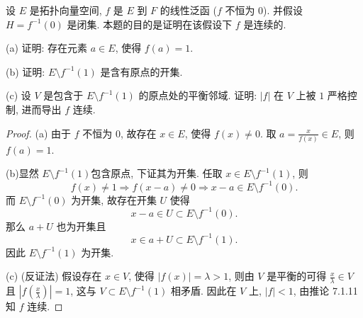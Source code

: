 \begin{exercise}
    设 $E$ 是拓扑向量空间, $f$ 是 $E$ 到 $F$ 的线性泛函 ($f$ 不恒为 $0$). 
    并假设 $H=f^{-1}(0)$ 是闭集. 本题的目的是证明在该假设下 $f$ 是连续的.

    (a) 证明: 存在元素 $a\in E$, 使得 $f(a)=1$.

    (b) 证明: $E\setminus f^{-1}(1)$ 是含有原点的开集.

    (c) 设 $V$ 是包含于 $E\setminus f^{-1}(1)$ 的原点处的平衡邻域. 证明: $|f|$ 在 $V$ 上被 $1$ 严格控制, 进而导出 $f$ 连续.
\end{exercise}

\begin{proof}
    (a) 由于 $f$ 不恒为 $0$, 故存在 $x\in E$, 使得 $f(x)\neq 0$.
    取 $a=\frac{x}{f(x)}\in E$, 则 $f(a)=1$.

    (b)显然 $E\setminus f^{-1}(1)$包含原点,
    下证其为开集. 任取 $x\in E\setminus f^{-1}(1)$, 则 
    \[f(x)\neq 1\Rightarrow f(x-a)\neq 0\Rightarrow x-a\in E\setminus f^{-1}(0).\]
    而 $E\setminus f^{-1}(0)$ 为开集, 故存在开集 $U$ 使得 
    \[x-a\in U\subset E\setminus f^{-1}(0).\]
    那么 $a+U$ 也为开集且
    \[x\in a+U\subset E\setminus f^{-1}(1).\]
    因此 $E\setminus f^{-1}(1)$ 为开集.

    (c) (反证法) 假设存在 $x\in V$, 使得 $|f(x)|=\lambda>1$,
    则由 $V$ 是平衡的可得 $\frac{x}{\lambda}\in V$ 且 $|f(\frac{x}{\lambda})|=1$,
    这与 $V\subset E\setminus f^{-1}(1)$ 相矛盾.
    因此在 $V$ 上, $|f|<1$, 由推论 7.1.11 知 $f$ 连续.
\end{proof}





